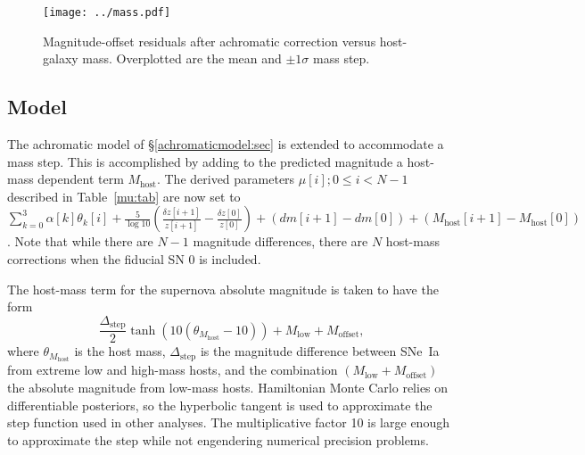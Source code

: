 \documentclass{aastex61}   	%
\begin{document}
\begin{figure}[htbp] %
   \centering
   \texttt{[image: ../mass.pdf]}
   \caption{Magnitude-offset residuals after achromatic correction versus host-galaxy mass.   Overplotted are the mean
   and $\pm1 \sigma$ mass step.     \label{mass:fig}}
\end{figure}

\subsection{Model}

The achromatic model of \S\ref{achromaticmodel:sec} is extended to accommodate a mass step.
This is accomplished by adding to the predicted magnitude a host-mass dependent term $M_\mathrm{host}$.
The derived parameters
$ \mu[i]; 0 \le i < N-1$ described in  Table~\ref{mu:tab} are now set to   $\sum_{k=0}^{3} \alpha[k] \theta_k[i] + \frac{5}{\log{10}}\left(\frac{\delta z[i+1]}{z[i+1]} -\frac{\delta z[0]}{z[0]}\right) + \left(dm[i+1]-dm[0]\right) + \left(M_\mathrm{host}[i+1]-M_\mathrm{host}[0]\right)$.
Note that while there are $N-1$ magnitude differences, there are $N$ host-mass corrections when the fiducial SN 0 is included.

The host-mass term for the supernova absolute magnitude is taken to have the form
\begin{equation}
\frac{\Delta_{\mathrm{step}}}{2} \tanh{\left(10(\theta_{M_{\text{host}}}-10)\right)} + M_{\mathrm{low}} + M_{\mathrm{offset}},
\end{equation}
where $\theta_{M_{\text{host}}}$ is the host mass,  $\Delta_{\mathrm{step}}$  is the magnitude difference
between SNe~Ia from extreme low and  high-mass hosts, and the combination $(M_{\mathrm{low}}+M_{\mathrm{offset}})$ the  
absolute magnitude from low-mass hosts.  Hamiltonian
Monte Carlo relies on differentiable posteriors, so the hyperbolic tangent is used to approximate the step function used in other analyses.
The multiplicative factor 10 is large enough to approximate the step while not engendering numerical precision problems.
\end{document}

